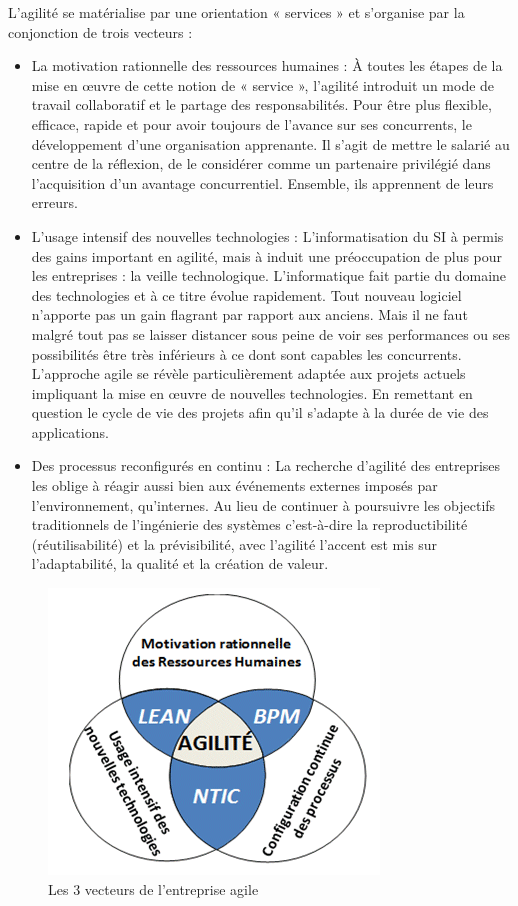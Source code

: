 \documentclass[12pt,a4paper]{article}
\begin{document}
L’agilité se matérialise par une orientation « services » et s’organise par la conjonction de trois vecteurs :\\
\begin{itemize}
\item La motivation rationnelle des ressources humaines : À toutes les étapes de la mise en œuvre de cette notion de « service », l’agilité introduit un mode de travail collaboratif et le partage des responsabilités. Pour être plus flexible, efficace, rapide et pour avoir toujours de l’avance sur ses concurrents, le développement d'une organisation apprenante. Il s'agit de mettre le salarié au centre de la réflexion, de le considérer comme un partenaire privilégié dans l'acquisition d'un avantage concurrentiel. Ensemble, ils apprennent de leurs erreurs.\\
\item L’usage intensif des nouvelles technologies : L’informatisation du SI à permis des gains important en agilité, mais à induit une préoccupation de plus pour les entreprises : la veille technologique. L’informatique fait partie du domaine des technologies et à ce titre évolue rapidement. Tout nouveau logiciel n’apporte pas un gain flagrant par rapport aux anciens. Mais il ne faut malgré tout pas se laisser distancer sous peine de voir ses performances ou ses possibilités être très inférieurs à ce dont sont capables les concurrents. L’approche agile se révèle particulièrement adaptée aux projets actuels impliquant la mise en œuvre de nouvelles technologies. En remettant en question le cycle de vie des projets afin qu’il s’adapte à la durée de vie des applications.\\
\item Des processus reconfigurés en continu : La recherche d’agilité des entreprises les oblige à réagir aussi bien aux événements externes imposés par l’environnement, qu’internes. Au lieu de continuer à poursuivre les objectifs traditionnels de l’ingénierie des systèmes c’est-à-dire la reproductibilité (réutilisabilité) et la prévisibilité, avec l’agilité l'accent est mis sur l’adaptabilité, la qualité et la création de valeur.\\
\end{itemize}

\begin{figure}[h!]
\centering
\includegraphics[scale=0.95]{ComposantesAgilite}
\caption{Les 3 vecteurs de l'entreprise agile}
\label{fig:vecteur}
\end{figure}
\end{document}
